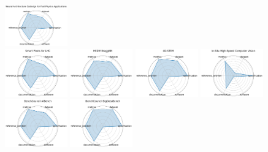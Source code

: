 \documentclass{article}
\begin{document}
\begin{figure}[ht!]
\includegraphics[width=0.2400\textwidth]{Neural Architecture Codesign for Fast Physics Applications_radar.pdf}
\\[1ex]
\includegraphics[width=0.2400\textwidth]{Smart Pixels for LHC_radar.pdf}
\includegraphics[width=0.2400\textwidth]{HEDM BraggNN_radar.pdf}
\includegraphics[width=0.2400\textwidth]{4D-STEM_radar.pdf}
\includegraphics[width=0.2400\textwidth]{In-Situ High-Speed Computer Vision_radar.pdf}
\\[1ex]
\includegraphics[width=0.2400\textwidth]{BenchCouncil AIBench_radar.pdf}
\includegraphics[width=0.2400\textwidth]{BenchCouncil BigDataBench_radar.pdf}

\end{figure}
\end{document}
